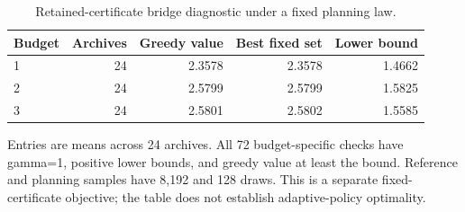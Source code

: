 \begin{table}[htbp]
\centering\small
\setlength{\tabcolsep}{4pt}
\caption{Retained-certificate bridge diagnostic under a fixed planning law.}
\label{tab:ext-retained}
\begin{tabular}{lrrrr}
\toprule
Budget & Archives & Greedy value & Best fixed set & Lower bound \\
\midrule
1 & 24 & 2.3578 & 2.3578 & 1.4662 \\
2 & 24 & 2.5799 & 2.5799 & 1.5825 \\
3 & 24 & 2.5801 & 2.5802 & 1.5585 \\
\bottomrule
\end{tabular}
\par\smallskip\begin{minipage}{0.97\linewidth}\footnotesize Entries are means across 24 archives. All 72 budget-specific checks have gamma=1, positive lower bounds, and greedy value at least the bound. Reference and planning samples have 8,192 and 128 draws. This is a separate fixed-certificate objective; the table does not establish adaptive-policy optimality.\end{minipage}
\end{table}
